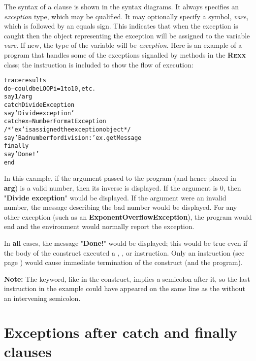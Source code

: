 The syntax of a  clause is shown in the syntax diagrams.
It always specifies an \emph{exception} type, which may be
qualified.  It may optionally specify a symbol, \emph{vare}, which
is followed by an equals sign.  This indicates that when the exception
is caught then the object representing the exception will be assigned to
the variable \emph{vare}.  If new, the type of the variable will be
\emph{exception}.
 Here is an example of a program that handles some of the exceptions
signalled by methods in the \textbf{R\textsc{exx}} class; the  instruction is included to show the flow of execution:
\begin{alltt}
trace results
do                -- could be LOOP i=1 to 10, etc.
  say 1/arg
catch DivideException
  say 'Divide exception'
catch ex=NumberFormatException
  /* 'ex' is assigned the exception object */
  say 'Bad number for division:' ex.getMessage
finally
  say 'Done!'
end
\end{alltt}
In this example, if the argument passed to the program (and hence
placed in \textbf{arg}) is a valid number, then its inverse is
displayed.  If the argument is 0, then "\textbf{Divide
exception}" would be displayed.  If the argument were an invalid
number, the message describing the bad number would be displayed.
For any other exception (such as an \textbf{ExponentOverflowException}),
the program would end and the environment would normally report the
exception.
 
In \textbf{all} cases, the message "\textbf{Done!}" would be
displayed; this would be true even if the body of the 
construct executed a , , or
 instruction.  Only an   instruction (see page \pageref{refexit}) would cause immediate termination of the construct (and
the program).
\begin{shaded}\noindent
\textbf{Note: }The  keyword, like  in the
 construct, implies a semicolon after it, so the last
 instruction in the example could have appeared on the same
line as the  without an intervening semicolon.
\end{shaded}\indent
\section{Exceptions after catch and finally clauses}
 
